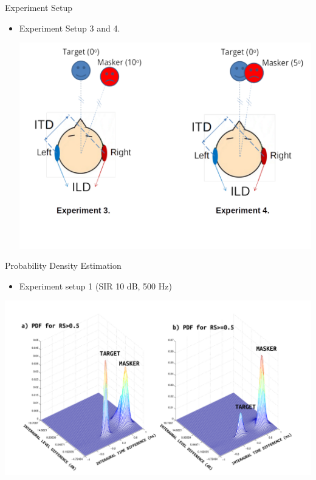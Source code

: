 \documentclass{beamer}
\begin{document}
\begin{frame}[t]{Experiment Setup}
\begin{itemize}
\item Experiment Setup 3 and 4.
\begin{center}
	\includegraphics[scale=0.3]{../pict/exp3-4.png}
\end{center}
\end{itemize}
\end{frame}

\begin{frame}[t]{Probability Density Estimation}
\begin{itemize}
\item Experiment setup 1 (SIR 10 dB, 500 Hz)
\end{itemize}
	\begin{center}
	\includegraphics[scale=0.27]{../pict/plot_probability_T0MM30FP10_500Hz.pdf}
	\end{center}
\end{frame}
\end{document}

